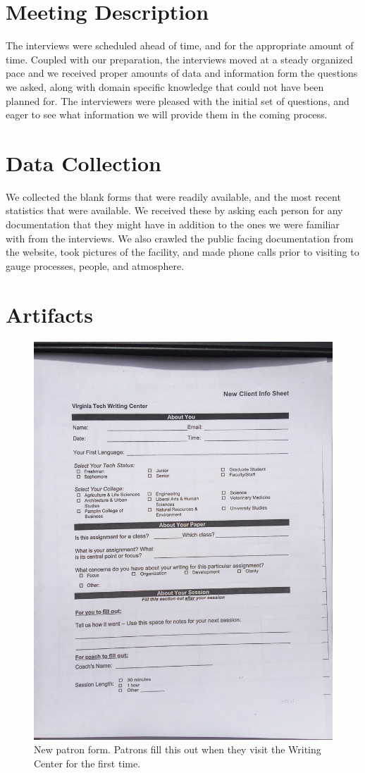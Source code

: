 \documentclass[12pt]{article} %
\begin{document}
\section{Meeting Description} %
  The interviews were scheduled ahead of time, and for the appropriate amount of time.
  Coupled with our preparation, the interviews moved at a steady organized pace and we received proper amounts of data and information form the questions we asked, along with domain specific knowledge that could not have been planned for.
  The interviewers were pleased with the initial set of questions, and eager to see what information we will provide them in the coming process.

\section{Data Collection} %
  We collected the blank forms that were readily available, and the most recent statistics that were available.
  We received these by asking each person for any documentation that they might have in addition to the ones we were familiar with from the interviews.
  We also crawled the public facing documentation from the website, took pictures of the facility, and made phone calls prior to visiting to gauge processes, people, and atmosphere.

\section{Artifacts} %
  \begin{figure}[H]
  \centering
  \includegraphics[width=0.5\linewidth]{artifacts/new_client_form}
  \caption{New patron form. Patrons fill this out when they visit the Writing Center for the first time.}
  \label{fig:NewClientForm}
  \end{figure}
\end{document}
